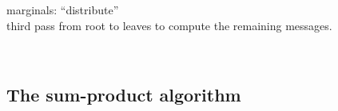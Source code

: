 \begin{frame}
\begin{minipage}[c]{12.1cm}
\begin{minipage}{8cm}
\begin{itemize}
					marginals: ``distribute''\\
					third pass from root to leaves to compute the remaining messages.
			\end{itemize}
		\end{minipage}
		\hfill {} \\
	\end{minipage}
\end{frame}




\subsection{The sum-product algorithm}
